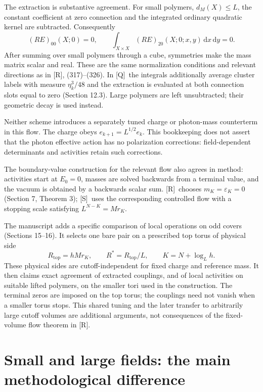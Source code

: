 \documentclass[11pt]{article}
\numberwithin{equation}{section}
\newcommand{\dd}{\mathrm d}
\newcommand{\Q}{\textup{[Q]}}
\newcommand{\UR}{\textup{[R]}}
\newcommand{\US}{\textup{[S]}}
\begin{document}
The extraction is substantive agreement. For small polymers,
$d_M(X)\le L$, the constant coefficient at zero connection and the
integrated ordinary quadratic kernel are subtracted. Consequently
\begin{equation}
 (RE)_{00}(X;0)=0,\qquad
 \int_{X\times X}(RE)_{20}(X;0;x,y)\,\dd x\,\dd y=0.
\end{equation}
After summing over small polymers through a cube, symmetries make the
mass matrix scalar and real. These are the same normalization
conditions and relevant directions as in \UR, (317)--(326).
In \Q\ the integrals additionally average cluster labels with measure
$\eta_k^3/48$ and the extraction is evaluated at both connection slots
equal to zero (Section 12.3). Large polymers are left unsubtracted;
their geometric decay is used instead.

Neither scheme introduces a separately tuned charge or photon-mass
counterterm in this flow. The charge obeys
$e_{k+1}=L^{1/2}e_k$. This bookkeeping does not assert that the photon
effective action has no polarization corrections: field-dependent
determinants and activities retain such corrections.

The boundary-value construction for the relevant flow also agrees
in method: activities start at $E_0=0$, masses are solved backwards
from a terminal value, and the vacuum is obtained by a backwards
scalar sum. \UR\ chooses $m_K=\varepsilon_K=0$
(Section 7, Theorem 3); \US\ uses the corresponding controlled flow
with a stopping scale satisfying $L^{N-K}=Mr_K$.

The manuscript adds a specific comparison of local operations on
odd covers (Sections 15--16). It selects one bare pair on a prescribed
top torus of physical side
\begin{equation}
 R_{\mathrm{top}}=hMr_K,\qquad
 R^*=R_{\mathrm{top}}/L,\qquad K=N+\log_Lh.
\end{equation}
These physical sides are cutoff-independent for fixed charge and
reference mass. It then claims exact agreement of extracted
couplings, and of local activities on suitable lifted polymers,
on the smaller tori used in the construction. The terminal zeros are
imposed on the top torus; the couplings need not vanish when a smaller
torus stops. This shared tuning and the later transfer to arbitrarily
large cutoff volumes are additional arguments, not consequences of
the fixed-volume flow theorem in \UR.

\section{Small and large fields: the main methodological difference}
\end{document}
